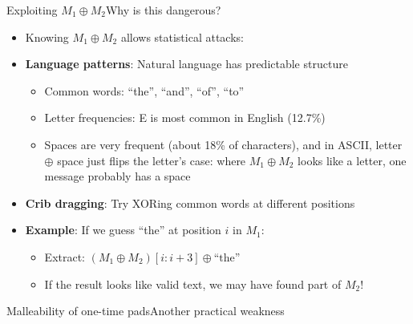 \ifdefined\PRESENTATION\else\PassOptionsToClass{handout}{beamer}\fi\documentclass[aspectratio=169, lualatex]{beamer}
\begin{document}
\begin{frame}{Exploiting $M_1 \oplus M_2$}{Why is this dangerous?}
	\begin{itemize}[<+->]
		\item Knowing $M_1 \oplus M_2$ allows statistical attacks:
		\item \textbf{Language patterns}: Natural language has predictable structure
		      \begin{itemize}[<+->]
			      \item Common words: ``the'', ``and'', ``of'', ``to''
			      \item Letter frequencies: E is most common in English (12.7\%)
			      \item Spaces are very frequent (about 18\% of characters), and in ASCII, letter $\oplus$ space just flips the letter's case: where $M_1 \oplus M_2$ looks like a letter, one message probably has a space
		      \end{itemize}
		\item \textbf{Crib dragging}: Try XORing common words at different positions
		\item \textbf{Example}: If we guess ``the'' at position $i$ in $M_1$:
		      \begin{itemize}[<+->]
			      \item Extract: $(M_1 \oplus M_2)[i:i+3] \oplus \text{``the''}$
			      \item If the result looks like valid text, we may have found part of $M_2$!
		      \end{itemize}
	\end{itemize}
\end{frame}

\begin{frame}{Malleability of one-time pads}{Another practical weakness}
	\begin{columns}[c]
	\end{columns}
\end{frame}
\end{document}
